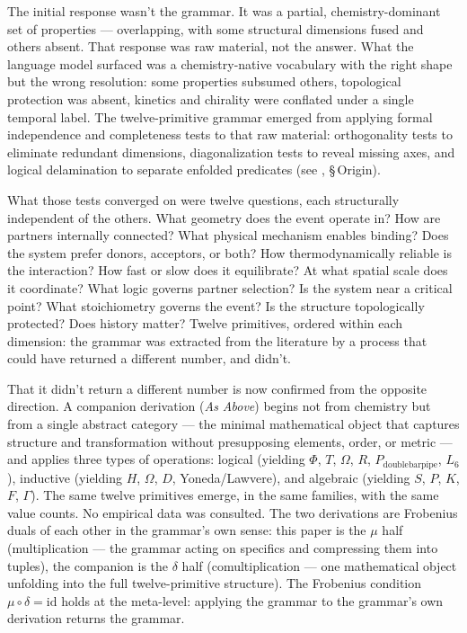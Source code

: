 \documentclass[12pt,a4paper]{article}
\begin{document}
The initial response wasn't the grammar. It was a partial, chemistry-dominant
set of properties --- overlapping, with some structural dimensions fused and
others absent. That response was raw material, not the answer. What the
language model surfaced was a chemistry-native vocabulary with the right
shape but the wrong resolution: some properties subsumed others, topological
protection was absent, kinetics and chirality were conflated under a single
temporal label. The twelve-primitive grammar emerged from applying formal
independence and completeness tests to that raw material: orthogonality tests
to eliminate redundant dimensions, diagonalization tests to reveal missing
axes, and logical delamination to separate enfolded predicates
(see , \S\,Origin).

What those tests converged on were twelve questions, each structurally
independent of the others. What geometry does the event operate in? How
are partners internally connected? What physical mechanism enables binding?
Does the system prefer donors, acceptors, or both? How thermodynamically
reliable is the interaction? How fast or slow does it equilibrate? At what
spatial scale does it coordinate? What logic governs partner selection? Is
the system near a critical point? What stoichiometry governs the event? Is
the structure topologically protected? Does history matter? Twelve
primitives, ordered within each dimension: the grammar was extracted from
the literature by a process that could have returned a different number, and
didn't.

That it didn't return a different number is now confirmed from the opposite
direction. A companion derivation (\emph{As Above}) begins not
from chemistry but from a single abstract category --- the minimal
mathematical object that captures structure and transformation without
presupposing elements, order, or metric --- and applies three types of
operations: logical (yielding $\Phi$, $T$, $\Omega$, $R$, $P_{\text{doublebarpipe}}$,
$L_6$), inductive (yielding $H$, $\Omega$, $D$, Yoneda/Lawvere), and
algebraic (yielding $S$, $P$, $K$, $F$, $\Gamma$). The same twelve
primitives emerge, in the same families, with the same value counts.
No empirical data was consulted. The two derivations are Frobenius
duals of each other in the grammar's own sense: this paper is the
$\mu$ half (multiplication --- the grammar acting on specifics and
compressing them into tuples), the companion is the $\delta$ half
(comultiplication --- one mathematical object unfolding into the
full twelve-primitive structure). The Frobenius condition
$\mu \circ \delta = \mathrm{id}$ holds at the meta-level: applying
the grammar to the grammar's own derivation returns the grammar.
\end{document}
